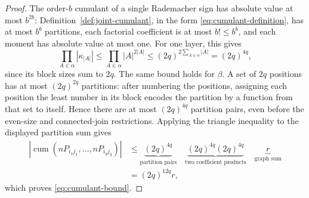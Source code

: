 \documentclass[11pt]{article}
\theoremstyle{definition}
\theoremstyle{remark}
\theoremstyle{plain}
\DeclareMathOperator{\cum}{cum}
\begin{document}
\begin{proof}
The order-\(b\) cumulant of a single Rademacher sign has absolute value
at most \(b^{2b}\): Definition~\ref{def:joint-cumulant}, in the
form \eqref{eq:cumulant-definition}, has at most \(b^b\) partitions, each
factorial coefficient is at most \(b!\le b^b\), and each moment has
absolute value at most one. For one layer, this gives
\[
 \prod_{A\in\alpha}|\kappa_{|A|}|
 \le\prod_{A\in\alpha}|A|^{2|A|}
 \le(2q)^{2\sum_{A\in\alpha}|A|}
 =(2q)^{4q},
\]
since its block sizes sum to $2q$. The same bound holds for $\beta$.
A set of $2q$ positions has at most $(2q)^{2q}$ partitions: after
numbering the positions, assigning each position the least number
in its block encodes the partition
by a function from that set to itself. Hence there are at most
$(2q)^{4q}$ partition pairs, even before the even-size and connected-join
restrictions. Applying the triangle inequality to the displayed
partition sum gives
\[
 \begin{aligned}
 \left|\cum(nP_{i_1j_1},\ldots,nP_{i_qj_q})\right|
 &\le \underbrace{(2q)^{4q}}_{\text{partition pairs}}
     \quad\underbrace{(2q)^{4q}(2q)^{4q}}_{\text{two coefficient products}}
     \quad\underbrace{r}_{\text{graph sum}}\\
 &=(2q)^{12q}r,
 \end{aligned}
\]
which proves \eqref{eq:cumulant-bound}.


\end{proof}
\end{document}
